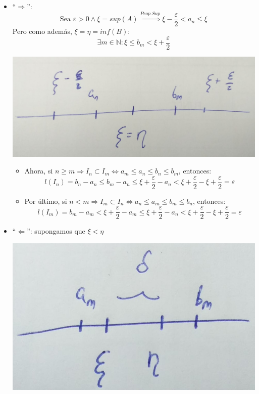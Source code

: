 \documentclass[10pt,a4paper,openright]{book}
\begin{document}
\begin{itemize}
\item ``$\Rightarrow$'':
$$\mbox{Sea }\varepsilon>0\wedge \xi=sup(A)\stackrel{Prop. Sup}{\Rightarrow} \xi-\frac{\varepsilon}{2}<a_n\leq \xi$$
Pero como además, $\xi=\eta=inf(B)$:
$$\exists m \in \mathbb N: \xi\leq b_m< \xi+ \frac{\varepsilon}{2}$$

\begin{center}
\includegraphics[scale=0.25]{corolario cantor}
\end{center}

	\begin{itemize}
	\item Ahora, si $n\geq m\Rightarrow I_n\subset I_m\Leftrightarrow a_m\leq a_n\leq b_n\leq b_m$, entonces:
$$l(I_n)=b_n-a_n\leq b_m-a_n\leq \xi+ \frac{\varepsilon}{2}-a_n<\xi+ \frac{\varepsilon}{2}-\xi+ \frac{\varepsilon}{2}=\varepsilon$$

	\item Por último, si $n<m\Rightarrow I_m\subset I_n\Leftrightarrow a_n\leq a_m\leq b_m\leq b_n$, entonces:
$$l(I_m)=b_m-a_m< \xi+\frac{\varepsilon}{2}-a_m\leq \xi+\frac{\varepsilon}{2}-a_n<\xi+\frac{\varepsilon}{2}-\xi+\frac{\varepsilon}{2}=\varepsilon$$
	\end{itemize}

\item ``$\Leftarrow$'': supongamos que $\xi<\eta$

\begin{center}
\includegraphics[scale=0.25]{corolario cantor 2}
\end{center}


\end{itemize}
\end{document}
